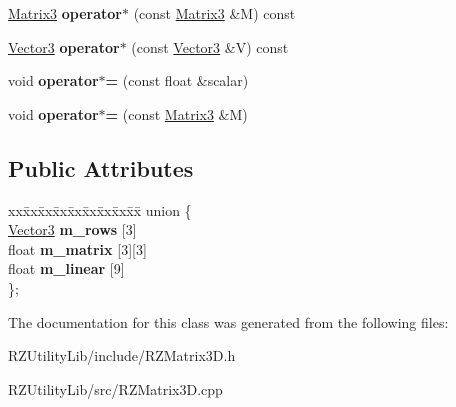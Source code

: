 \begin{DoxyCompactItemize}
\item 
\hypertarget{classrcz_engine_1_1_matrix3_a6649157a4c67212e6fde107617e5312f}{}\hyperlink{classrcz_engine_1_1_matrix3}{Matrix3} {\bfseries operator$\ast$} (const \hyperlink{classrcz_engine_1_1_matrix3}{Matrix3} \&M) const \label{classrcz_engine_1_1_matrix3_a6649157a4c67212e6fde107617e5312f}

\item 
\hypertarget{classrcz_engine_1_1_matrix3_ab9124cd86df0ea89e373a76724e40da7}{}\hyperlink{classrcz_engine_1_1_vector3}{Vector3} {\bfseries operator$\ast$} (const \hyperlink{classrcz_engine_1_1_vector3}{Vector3} \&V) const \label{classrcz_engine_1_1_matrix3_ab9124cd86df0ea89e373a76724e40da7}

\item 
\hypertarget{classrcz_engine_1_1_matrix3_ab53e27fbd7c33496ec8e4b3e2e7d8614}{}void {\bfseries operator$\ast$=} (const float \&scalar)\label{classrcz_engine_1_1_matrix3_ab53e27fbd7c33496ec8e4b3e2e7d8614}

\item 
\hypertarget{classrcz_engine_1_1_matrix3_ad158045c4a94b3045f19050279f826cf}{}void {\bfseries operator$\ast$=} (const \hyperlink{classrcz_engine_1_1_matrix3}{Matrix3} \&M)\label{classrcz_engine_1_1_matrix3_ad158045c4a94b3045f19050279f826cf}

\end{DoxyCompactItemize}
\subsection*{Public Attributes}
\begin{DoxyCompactItemize}
\item 
\hypertarget{classrcz_engine_1_1_matrix3_ac8e71533bbdf9b91be4e06081eed43f0}{}\begin{tabbing}
xx\=xx\=xx\=xx\=xx\=xx\=xx\=xx\=xx\=\kill
union \{\\
\>\hyperlink{classrcz_engine_1_1_vector3}{Vector3} {\bfseries m\_rows} \mbox{[}3\mbox{]}\\
\>float {\bfseries m\_matrix} \mbox{[}3\mbox{]}\mbox{[}3\mbox{]}\\
\>float {\bfseries m\_linear} \mbox{[}9\mbox{]}\\
\}; \label{classrcz_engine_1_1_matrix3_ac8e71533bbdf9b91be4e06081eed43f0}
\\

\end{tabbing}\end{DoxyCompactItemize}


The documentation for this class was generated from the following files\+:\begin{DoxyCompactItemize}
\item 
R\+Z\+Utility\+Lib/include/R\+Z\+Matrix3\+D.\+h\item 
R\+Z\+Utility\+Lib/src/R\+Z\+Matrix3\+D.\+cpp\end{DoxyCompactItemize}
